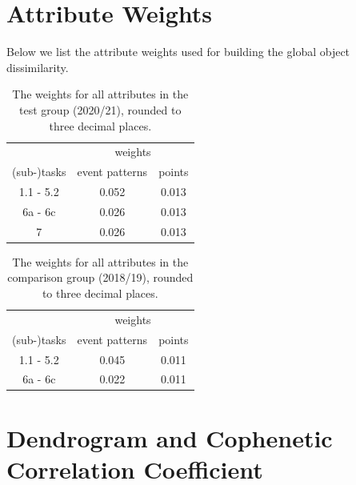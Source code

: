 \documentclass{edm_article}
\begin{document}
\section{Attribute Weights}  \label{sec:weights}

Below we list the attribute weights used for building the global object dissimilarity.

\begin{table}[h!]
{\footnotesize
\caption{The weights for all attributes in the test group (2020/21), rounded to three decimal places.}
\label{tab:weights2019}
\begin{center}
\begin{tabular}{ccc}
\toprule
& \multicolumn{2}{c}{weights} \\
\cline{2-3}
\rule{0pt}{12pt} (sub-)tasks & event patterns & points  \\
\midrule
\rule{0pt}{12pt}1.1 - 5.2 & 0.052 & 0.013 \\
\rule{0pt}{12pt}6a - 6c & 0.026 & 0.013 \\
\rule{0pt}{12pt}7 & 0.026 & 0.013 \\
\bottomrule
\end{tabular}
\end{center}
}
\end{table}

\begin{table}[h!]
\footnotesize{
\caption{The weights for all attributes in the comparison group (2018/19), rounded to three decimal places.}
\label{tab:weights1819}
\begin{center}
\begin{tabular}{ccc}
\toprule
& \multicolumn{2}{c}{weights} \\
\cline{2-3}
\rule{0pt}{12pt} (sub-)tasks & event patterns & points  \\
\midrule
\rule{0pt}{12pt}1.1 - 5.2 & 0.045 & 0.011 \\
\rule{0pt}{12pt}6a - 6c & 0.022 & 0.011 \\
\bottomrule
\end{tabular}
\end{center}
}
\end{table}

\FloatBarrier


\section{Dendrogram and Cophenetic Correlation Coefficient} \label{sec:dendro}
\end{document}
